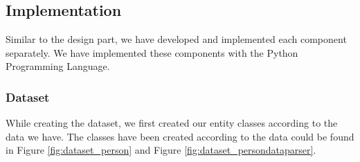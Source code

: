 \documentclass{mefsdp}
\begin{document}
	
%	
%	
	\subsection{Implementation}
	Similar to the design part, we have developed and implemented each component separately. We have implemented these components with the Python Programming Language.
	\subsubsection{Dataset}
	While creating the dataset, we first created our entity classes according to the data we have. The classes have been created according to the data could be found in Figure \ref{fig:dataset_person} and Figure \ref{fig:dataset_persondataparser}.\\
	
\end{document}
